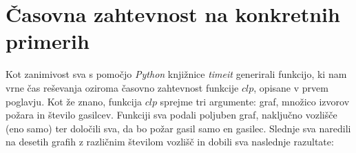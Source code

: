 \documentclass[a4paper, 12pt]{article}
\begin{document}
\pagebreak


\section{Časovna zahtevnost na konkretnih primerih}
\overfullrule=0pt

Kot zanimivost sva s pomočjo \emph{Python} knjižnice \emph{timeit} generirali funkcijo, ki nam 
vrne čas reševanja oziroma časovno zahtevnost funkcije $clp$, opisane v prvem poglavju. 
Kot že znano, funkcija $clp$ sprejme tri argumente: graf, množico izvorov požara in
število gasilcev. Funkciji sva podali poljuben graf, naključno vozlišče (eno samo) ter
določili sva, da bo požar gasil samo en gasilec.
Slednje sva naredili na desetih grafih z različnim številom vozlišč in dobili sva
naslednje razultate: \\
\end{document}

